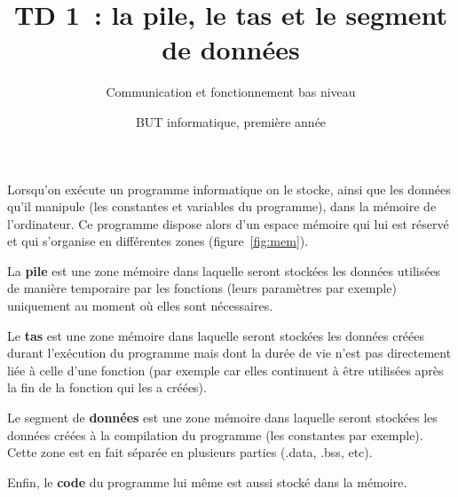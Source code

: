\documentclass[a4paper]{article}
\title{TD 1~: la pile, le tas et le segment de données}
\author{Communication et fonctionnement bas niveau}
\date{BUT informatique, première année}
\begin{document}
\maketitle{}

Lorsqu'on exécute un programme informatique on le stocke, ainsi que les données qu'il manipule (les constantes et variables du programme), dans la mémoire de l'ordinateur.
Ce programme dispose alors d'un espace mémoire qui lui est réservé et qui s'organise en différentes zones (figure~\ref{fig:mem}).

\vspace{0.5cm}

\begin{minipage}{0.3\textwidth}
  \centering
{}
\label{fig:mem}
\end{minipage}
\begin{minipage}{0.7\textwidth}
La {\bf pile} est une zone mémoire dans laquelle seront stockées les données utilisées de manière temporaire par les fonctions (leurs paramètres par exemple) uniquement au moment où elles sont nécessaires.

\vspace{1cm}

Le {\bf tas} est une zone mémoire dans laquelle seront stockées les données créées durant l'exécution du programme mais dont la durée de vie n'est pas directement liée à celle d'une fonction (par exemple car elles continuent à être utilisées après la fin de la fonction qui les a créées).

\vspace{1cm}

Le segment de {\bf données} est une zone mémoire dans laquelle seront stockées les données créées à la compilation du programme (les constantes par exemple). Cette zone est en fait séparée en plusieurs parties (.data, .bss, etc).

\vspace{1cm}

Enfin, le {\bf code} du programme lui même est aussi stocké dans la mémoire.

\vspace{1.5cm}
\end{minipage}
\end{document}
